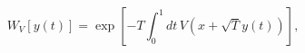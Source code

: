 \begin{equation}
W_V[y(t)]=\exp\left[-T \int_0^1 dt\, V(x+\sqrt{T}  y(t))\right],
\label{1.3a} 
\end{equation}

